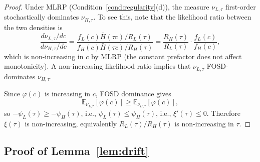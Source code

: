 \begin{proof}
Under MLRP (Condition~\ref{cond:regularity}(d)), the measure $\nu_{L,\tau}$ first-order stochastically dominates $\nu_{H,\tau}$. To see this, note that the likelihood ratio between the two densities is
\[
\frac{d\nu_{L,\tau}/dc}{d\nu_{H,\tau}/dc} = \frac{f_L(c) \bar H(\tau c) / R_L(\tau)}{f_H(c) \bar H(\tau c) / R_H(\tau)} = \frac{R_H(\tau)}{R_L(\tau)} \cdot \frac{f_L(c)}{f_H(c)},
\]
which is non-increasing in $c$ by MLRP (the constant prefactor does not affect monotonicity). A non-increasing likelihood ratio implies that $\nu_{L,\tau}$ FOSD-dominates $\nu_{H,\tau}$.

Since $\varphi(c)$ is increasing in $c$, FOSD dominance gives
\[
\mathbb{E}_{\nu_{L,\tau}}[\varphi(c)] \geq \mathbb{E}_{\nu_{H,\tau}}[\varphi(c)],
\]
so $-\psi_L(\tau) \geq -\psi_H(\tau)$, i.e., $\psi_L(\tau) \leq \psi_H(\tau)$, i.e., $\xi'(\tau) \leq 0$. Therefore $\xi(\tau)$ is non-increasing, equivalently $R_L(\tau)/R_H(\tau)$ is non-increasing in $\tau$.
\end{proof}

\subsection{Proof of Lemma~\ref{lem:drift}}
\label{ssec:proof_drift}

